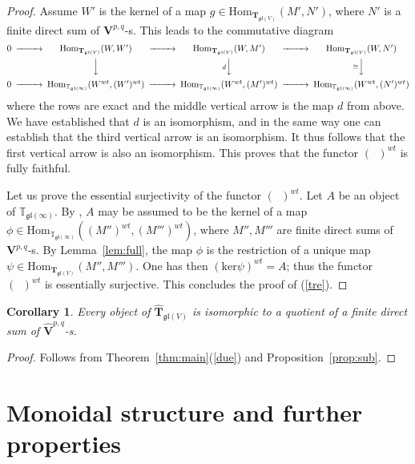 \documentclass[12pt,reqno]{amsart}
\newcommand{\Hom}{\mathrm{Hom}}
\newtheorem{cor}[thm]{Corollary}
\theoremstyle{definition}
\theoremstyle{remark}
\begin{document}
\begin{proof}
	Assume $W'$  is the kernel of a map 
	$g\in \Hom_{\mathbf{T}_{\mathfrak{gl}(V)}}(M', N')$, where $N'$ is a finite direct sum of $\mathbf{V}^{p,q}$-s. This leads to the commutative diagram
	$$
	\begin{CD}
	0 @>>>\Hom_{\mathbf{T}_{\mathfrak{gl}(V)}}(W, W')@>>> \Hom_{\mathbf{T}_{\mathfrak{gl}(V)}}(W, M') @>>> \Hom_{\mathbf{T}_{\mathfrak{gl}(V)}}(W, N')\\
	@. @VVV @V{d}VV  @V{\cong}VV\\
	0 @>>>\Hom_{\mathbb{T}_{\mathfrak{gl}(\infty)}}(W^{wt}, (W')^{wt})@>>> \Hom_{\mathbb{T}_{\mathfrak{gl}(\infty)}}(W^{wt}, (M')^{wt}) @>>> \Hom_{\mathbb{T}_{\mathfrak{gl}(\infty)}}(W^{wt}, (N')^{wt})
	\end{CD}
	$$
	where the rows are exact and the middle vertical arrow is the map $d$ from above. We have established that $d$ is an isomorphism, and in the same way one can establish that the third vertical arrow is an isomorphism. It thus follows that the first vertical arrow is also an isomorphism. This proves that the functor $(\phantom{a})^{wt}$ is fully faithful. 
	
	Let us prove the essential surjectivity of the functor $(\phantom{a})^{wt}$. Let $A$ be an object of $\mathbb{T}_{\mathfrak{gl}(\infty)}$. By \cite[Proposition~4.5]{DPS}, $A$ may be assumed to be the kernel of a map $\phi\in \Hom_{\mathbb{T}_{\mathfrak{gl}(\infty)}}((M'')^{wt}, (M''')^{wt})$, where $M'', M'''$ are finite direct sums of $\mathbf{V}^{p,q}$-s. By Lemma~\ref{lem:full}, the map $\phi$ is the restriction of a unique map $\psi\in \Hom_{\mathbf{T}_{\mathfrak{gl}(V)}}(M'', M''')$. One has then $(\mathrm{ker}\psi)^{wt}=A$; thus the functor $(\phantom{a})^{wt}$ is essentially surjective. This concludes the proof of (\ref{tre}).
	\end{proof}
	

	\begin{cor} \label{quot}
	    Every object of $\widehat{\mathbf{T}}_{\mathfrak{gl}(V)}$ is isomorphic to a quotient of a finite direct sum of $\widehat{\mathbf{V}}^{p,q}$-s.
	\end{cor}
	\begin{proof}
	    Follows from Theorem~\ref{thm:main}(\ref{due}) and Proposition~\ref{prop:sub}.
	\end{proof}
	
	
	
	
	
	\section{Monoidal structure and further properties}
	
\end{document}
